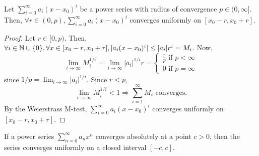 \begin{theorem}
    Let $\sum_{i=0}^\infty a_i(x - x_0)^i$ be a power series with radius of convergence $p \in (0, \infty]$. Then,  $\forall r \in (0, p), \sum_{i=0}^\infty a_i(x - x_0)^i$ converges uniformly on $[x_0 - r, x_0 + r]$.
\end{theorem}

\begin{proof}
    Let $r \in [0, p)$. Then, $\forall i \in \mathbb{N} \cup \{0\}, \forall x \in [x_0 - r, x_0 + r], |a_i(x-x_0)^i| \leq |a_i|r^i = M_i$. Now,
    \begin{equation*}
        \lim \limits_{i \to \infty} M_i^{1/i} = \lim \limits_{i \to \infty} |a_i|^{1/i} r = \begin{cases}
            \frac{r}{p} \text{ if } p < \infty \\
            0 \text{ if } p = \infty
        \end{cases}
    \end{equation*}
    since $1/p = \lim_{i \to \infty} |a_i|^{1/i}$. Since $r < p$,
    \begin{equation*}
        \lim \limits_{i \to \infty} M_i^{1/i} < 1 \Longrightarrow \sum \limits_{i=1}^\infty M_i \text{ converges.}
    \end{equation*}
    By the Weierstrass M-test, $\sum_{i=0}^\infty a_i(x-x_0)^i$ converges uniformly on $[x_0 - r, x_0 + r]$.
\end{proof}

\begin{theorem}
    If a power series $\sum_{n=0}^\infty a_n x^n$ converges absolutely at a point $c > 0$, then the series converges uniformly on a closed interval $[-c, c]$.
\end{theorem}

